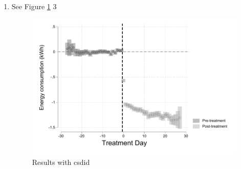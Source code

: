 \documentclass{article}
\begin{document}
\begin{enumerate}
\item 
See Figure \ref{fig:P2Q3} 3
\begin{figure}[ht]
    \centering
    \includegraphics[scale = 0.7]{PSgraph3.pdf}
    \caption{Results with csdid}
    \label{fig:P2Q3}
\end{figure}


\end{enumerate}
\end{document}
